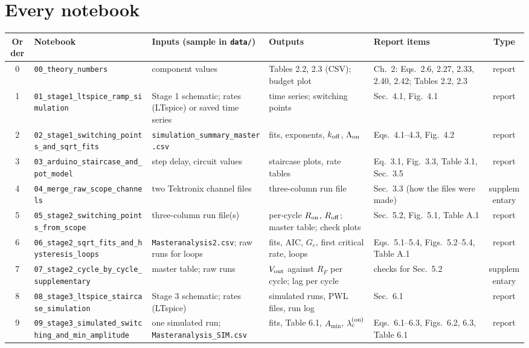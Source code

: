\documentclass[11pt]{article}
\newcommand{\nbf}[1]{\nolinkurl{#1}}
\begin{document}
\section*{Every notebook}
\footnotesize
\renewcommand{\arraystretch}{1.3}
\begin{tabularx}{\linewidth}{@{}c>{\raggedright\arraybackslash}p{5.2cm}>{\raggedright\arraybackslash}X>{\raggedright\arraybackslash}X>{\raggedright\arraybackslash}p{4.3cm}c@{}}
\toprule
\textbf{Order} & \textbf{Notebook} & \textbf{Inputs (sample in \texttt{data/})} & \textbf{Outputs} & \textbf{Report items} & \textbf{Type} \\
\midrule
0 & \nbf{00_theory_numbers} & component values & Tables 2.2, 2.3 (CSV); budget plot & Ch.~2: Eqs.\ 2.6, 2.27, 2.33, 2.40, 2.42; Tables 2.2, 2.3 & report \\
1 & \nbf{01_stage1_ltspice_ramp_simulation} & Stage 1 schematic; rates (LTspice) or saved time series & time series; switching points & Sec.\ 4.1, Fig.\ 4.1 & report \\
2 & \nbf{02_stage1_switching_points_and_sqrt_fits} & \texttt{simulation\_summary\_master.csv} & fits, exponents, $k_{\rm off}$, $\Lambda_{\rm on}$ & Eqs.\ 4.1--4.3, Fig.\ 4.2 & report \\
3 & \nbf{03_arduino_staircase_and_pot_model} & step delay, circuit values & staircase plots, rate tables & Eq.\ 3.1, Fig.\ 3.3, Table 3.1, Sec.\ 3.5 & report \\
4 & \nbf{04_merge_raw_scope_channels} & two Tektronix channel files & three-column run file & Sec.\ 3.3 (how the files were made) & supplementary \\
5 & \nbf{05_stage2_switching_points_from_scope} & three-column run file(s) & per-cycle $R_{\rm on}$, $R_{\rm off}$; master table; check plots & Sec.\ 5.2, Fig.\ 5.1, Table A.1 & report \\
6 & \nbf{06_stage2_sqrt_fits_and_hysteresis_loops} & \texttt{Masteranalysis2.csv}; raw runs for loops & fits, AIC, $G_c$, first critical rate, loops & Eqs.\ 5.1--5.4, Figs.\ 5.2--5.4, Table A.1 & report \\
7 & \nbf{07_stage2_cycle_by_cycle_supplementary} & master table; raw runs & $V_{\rm out}$ against $R_F$ per cycle; lag per cycle & checks for Sec.\ 5.2 & supplementary \\
8 & \nbf{08_stage3_ltspice_staircase_simulation} & Stage 3 schematic; rates (LTspice) & simulated runs, PWL files, run log & Sec.\ 6.1 & report \\
9 & \nbf{09_stage3_simulated_switching_and_min_amplitude} & one simulated run; \texttt{Masteranalysis\_SIM.csv} & fits, Table 6.1, $A_{\min}$, $\lambda_c^{\rm (on)}$ & Eqs.\ 6.1--6.3, Figs.\ 6.2, 6.3, Table 6.1 & report \\

\end{tabularx}
\end{document}
